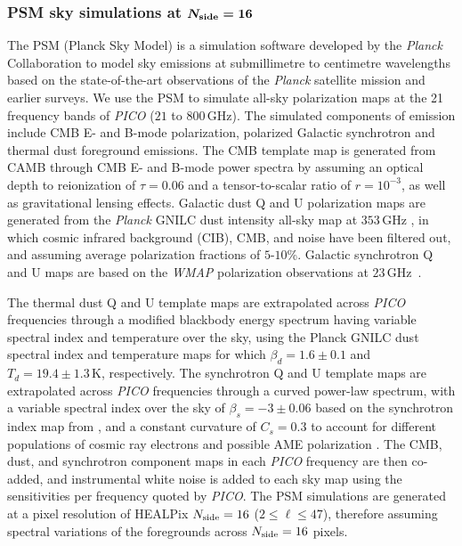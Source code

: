\documentclass[PICOReport.tex]{subfiles}
\begin{document}
\subsubsection{PSM sky simulations at $\boldsymbol{N_{\rm side}=16}$}

The PSM (Planck Sky Model) \cite{delabrouille/etal:2013} is a simulation software developed by the \emph{Planck} Collaboration  to model sky emissions at submillimetre to centimetre wavelengths based on the state-of-the-art observations of the \emph{Planck} satellite mission and earlier surveys. We use the {\sc PSM} to simulate all-sky polarization maps at the 21 frequency bands of \emph{PICO} ($21$ to $800$\,GHz). The simulated components of emission include CMB E- and B-mode polarization, polarized Galactic synchrotron and thermal dust foreground emissions. The CMB template map is generated from CAMB \cite{Lewis/etal:2000} through CMB E- and B-mode power spectra by assuming an optical depth to reionization of $\tau=0.06$ and a tensor-to-scalar ratio of $r = 10^{-3}$, as well as gravitational lensing effects. Galactic dust Q and U polarization maps are generated from the \emph{Planck} {\sc GNILC} 
dust intensity all-sky map at $353$\,GHz , in which cosmic infrared background (CIB), CMB, and noise have been filtered out, and assuming average polarization fractions of $5$-$10$\%. Galactic synchrotron Q and U maps are based on the \emph{WMAP} polarization observations at $23$\,GHz~\cite{Miville-Deschenes/etal:2008}. 

The thermal dust Q and U template maps are extrapolated across \emph{PICO} frequencies through a modified blackbody energy spectrum having variable spectral index and temperature over the sky, using the Planck {\sc GNILC} dust spectral index and temperature maps for which ${\beta_d = 1.6\pm 0.1}$ and ${T_d=19.4 \pm 1.3}$\,K, respectively. The synchrotron Q and U template maps are extrapolated across \emph{PICO} frequencies through a curved power-law spectrum, with a variable spectral index over the sky of ${\beta_s = -3\pm 0.06}$ based on the synchrotron index map from \cite{Miville-Deschenes/etal:2008}, and a constant curvature of $C_s = 0.3$ \cite{Kogut/etal:2007} to account for different populations of cosmic ray electrons  and possible AME polarization \cite{dickinson/etal:2018}. The CMB, dust, and synchrotron component maps in each \emph{PICO} frequency are then co-added, and instrumental white noise is added to each sky map using the sensitivities per frequency quoted by \emph{PICO}.
The PSM simulations are generated at a pixel resolution of HEALPix \cite{gorski/etal:2005} $N_{\rm side}=16$ ($2 \leq \ell \leq 47$), therefore assuming spectral variations of the foregrounds across $N_{\rm side}=16$ pixels.
\end{document}
